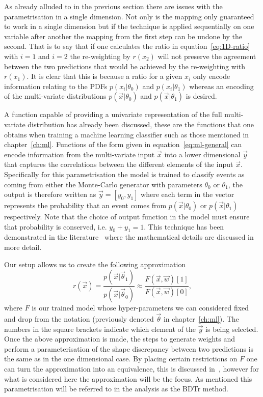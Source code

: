 As already alluded to in the previous section there are issues with the
parametrisation in a single dimension. Not only is the mapping only guaranteed
to work in a single dimension but if the technique is applied sequentially on
one variable after another the mapping from the first step can be undone by the
second. That is to say that if one calculates the ratio in
equation~\ref{eq:1D-ratio} with $i=1$ and $i=2$ the re-weighting by $r(x_2)$
will not preserve the agreement between the two predictions that would be
achieved by the re-weighting with $r(x_1)$. It is clear that this is because a
ratio for a given $x_i$ only encode information relating to the PDFs
$p(x_i|\theta_0)$ and $p(x_i|\theta_1)$ whereas an encoding of the multi-variate
distributions $p(\vec{x}|\theta_0)$ and $p(\vec{x}|\theta_1)$ is desired.

A function capable of providing a univariate representation of the full
multi-variate distribution has already been discussed, these are the functions
that one obtains when training a machine learning classifier such as those
mentioned in chapter~\ref{ch:ml}. Functions of the form given in
equation~\ref{eq:ml-general} can encode information from the multi-variate input
$\vec{x}$ into a lower dimensional $\vec{y}$ that captures the correlations
between the different elements of the input $\vec{x}$. Specifically for this
parametrisation the model is trained to classify events as coming from either
the Monte-Carlo generator with parameters $\theta_0$ or $\theta_1$, the output
is therefore written as $\vec{y} = [y_0, y_1]$ where each term in the vector
represents the probability that an event comes from $p(\vec{x} | \theta_0)$ or
$p(\vec{x} | \theta_1)$ respectively. Note that the choice of output function in
the model must ensure that probability is conserved, i.e. $y_0 + y_1 = 1$. This
technique has been demonstrated in the
literature~\cite{cranmer2016approximating} where the mathematical details are
discussed in more detail.

Our setup allows us to create the following approximation
\begin{equation}
  r(\vec{x}) =  \frac{p(\vec{x}|\vec{\theta}_{1})}{p(\vec{x}|\vec{\theta}_{0})}
  \approx \frac{F(\vec{x}, \vec{w})[1]}{F(\vec{x}, \vec{w})[0]},
  \label{eq:bdtr-approximation}
\end{equation}
where $F$ is our trained model whose hyper-parameters we can considered fixed
and drop from the notation (previously denoted $\vec{\theta}$ in
chapter~\ref{ch:ml}). The numbers in the square brackets indicate which element
of the $\vec{y}$ is being selected. Once the above approximation is made, the
steps to generate weights and perform a parameterisation of the shape
discrepancy between two predictions is the same as in the one dimensional case.
By placing certain restrictions on $F$ one can turn the approximation into an
equivalence, this is discussed in~\cite{VHModellingNote2019}, however for what
is considered here the approximation will be the focus. As mentioned this
parametrisation will be referred to in the analysis as the BDTr method.

